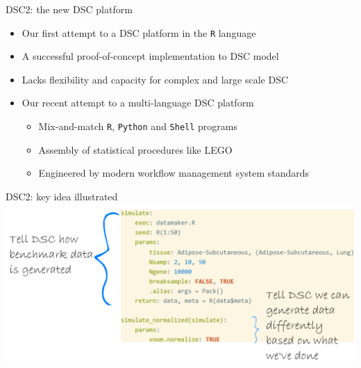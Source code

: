 \begin{frame}{DSC2: the new DSC platform}
  \dscr
\begin{itemize}
  \item Our first attempt to a DSC platform in the \texttt{R} language
  \item A successful proof-of-concept implementation to DSC model
  \item Lacks flexibility and capacity for complex and large scale DSC 
\end{itemize}
\bigskip
  \dscii
\begin{itemize}
  \item Our recent attempt to a multi-language DSC platform 
    \begin{itemize}
      \item Mix-and-match \texttt{R}, \texttt{Python} and \texttt{Shell} programs 
      \item Assembly of statistical procedures like LEGO 
      \item Engineered by modern workflow management system standards
     \end{itemize}
\end{itemize}
\end{frame}
\begin{frame}{DSC2: key idea illustrated}
  \centering \includegraphics[width=\textwidth]{figs/dsc1}
\end{frame}
